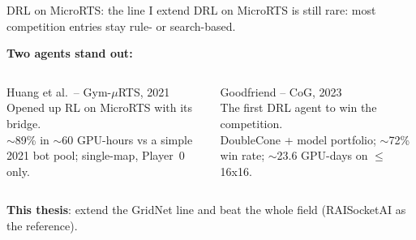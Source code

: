 \documentclass[aspectratio=169,11pt]{beamer}
\begin{document}
\begin{frame}[t]{DRL on MicroRTS: the line I extend}
  \small DRL on MicroRTS is still \alert{rare}: most competition entries stay
  rule- or search-based.\par
  \normalsize
  \vspace{0.5em}
  {\large\color{uclBlue}\textbf{Two agents stand out:}\par}
  \vspace{-0.4em}
  \begin{columns}[T]
    \begin{column}{0.48\textwidth}
      \begin{tcolorbox}[enhanced,colback=uclBlue!4,colframe=uclBlue,arc=5pt,boxrule=0.8pt,
        title={\faBorderAll~~GridNet},coltitle=white,colbacktitle=uclBlue,
        fonttitle=\large\bfseries,drop fuzzy shadow=black!18,
        left=6pt,right=6pt,top=7pt,bottom=8pt,height=0.40\textheight]
        {\footnotesize\color{black!55}Huang et al.\ -- Gym-$\mu$RTS, 2021}\\[0.6em]
        \footnotesize Opened up \alert{RL on MicroRTS} with its bridge.\\[0.5em]
        {\footnotesize $\sim$89\% in $\sim$60 GPU-hours vs a \alert{simple 2021 bot pool}; \alert{single-map}, Player~0 only.}
      \end{tcolorbox}
    \end{column}
    \begin{column}{0.48\textwidth}
      \begin{tcolorbox}[enhanced,colback=uclBlue!4,colframe=uclBlue,arc=5pt,boxrule=0.8pt,
        title={\faTrophy~~RAISocketAI},coltitle=white,colbacktitle=uclBlue,
        fonttitle=\large\bfseries,drop fuzzy shadow=black!18,
        left=6pt,right=6pt,top=7pt,bottom=8pt,height=0.40\textheight]
        {\footnotesize\color{black!55}Goodfriend -- CoG, 2023}\\[0.6em]
        \footnotesize The \alert{first DRL agent to win} the competition.\\[0.5em]
        {\footnotesize DoubleCone + model portfolio; $\sim$72\% win rate; $\sim$23.6 GPU-days on $\leq$16x16.}
      \end{tcolorbox}
    \end{column}
  \end{columns}
  \vspace{1.2em}
  {\footnotesize \textbf{This thesis}: extend the GridNet line and beat the
  \alert{whole field} (RAISocketAI as the reference).\par}
\end{frame}
\end{document}
